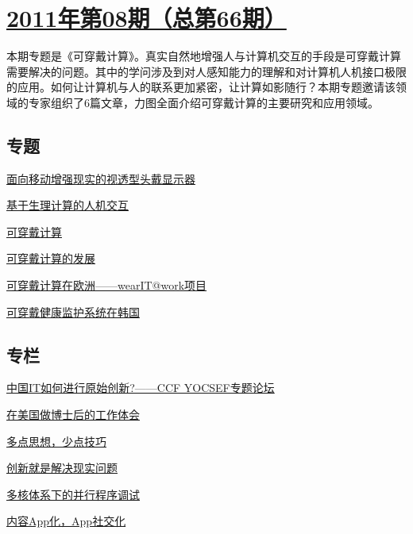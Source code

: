 \documentclass[a4paper]{article}
\begin{document}
\section{\href{http://history.ccf.org.cn/sites/ccf/jsjtbbd.jsp?contentId=2626706918868}{\textbf{2011年第08期（总第66期）}}}
本期专题是《可穿戴计算》。真实自然地增强人与计算机交互的手段是可穿戴计算需要解决的问题。其中的学问涉及到对人感知能力的理解和对计算机人机接口极限的应用。如何让计算机与人的联系更加紧密，让计算如影随行？本期专题邀请该领域的专家组织了6篇文章，力图全面介绍可穿戴计算的主要研究和应用领域。
\subsection{专题}
\href{http://history.ccf.org.cn/resources/1190201776262/2011/08/16/6.pdf}{面向移动增强现实的视透型头戴显示器}

\href{http://history.ccf.org.cn/resources/1190201776262/2011/08/15/3.pdf}{基于生理计算的人机交互}

\href{http://history.ccf.org.cn/resources/1190201776262/2011/08/15/1.pdf}{可穿戴计算}

\href{http://history.ccf.org.cn/resources/1190201776262/2011/08/15/2.pdf}{可穿戴计算的发展}

\href{http://history.ccf.org.cn/resources/1190201776262/2011/08/15/4.pdf}{可穿戴计算在欧洲——wearIT@work项目}

\href{http://history.ccf.org.cn/resources/1190201776262/2011/08/15/5.pdf}{可穿戴健康监护系统在韩国}

\subsection{专栏}
\href{http://history.ccf.org.cn/resources/1190201776262/2011/08/16/7.pdf}{中国IT如何进行原始创新?——CCF YOCSEF专题论坛}

\href{http://history.ccf.org.cn/resources/1190201776262/2011/08/16/9.pdf}{在美国做博士后的工作体会}

\href{http://history.ccf.org.cn/resources/1190201776262/2011/08/16/10.pdf}{多点思想，少点技巧}

\href{http://history.ccf.org.cn/resources/1190201776262/2011/08/16/8.pdf}{创新就是解决现实问题}

\href{http://history.ccf.org.cn/resources/1190201776262/2011/08/16/12.pdf}{多核体系下的并行程序调试}

\href{http://history.ccf.org.cn/resources/1190201776262/2011/08/16/11.pdf}{内容App化，App社交化}
\end{document}
